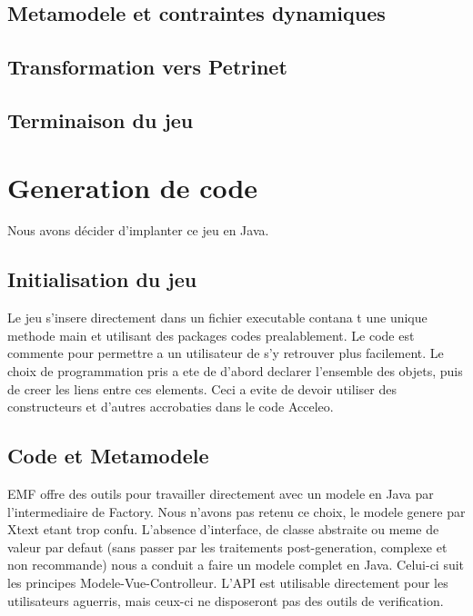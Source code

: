 \documentclass[12pt]{article}
\begin{document}
\subsection{Metamodele et contraintes dynamiques}

\subsection{Transformation vers Petrinet}

\subsection{Terminaison du jeu}

\section{Generation de code}
Nous avons décider d'implanter ce jeu en Java.
\subsection{Initialisation du jeu}
Le jeu s'insere directement dans un fichier executable contana t une unique methode main et utilisant des packages codes prealablement. Le code est commente pour permettre a un utilisateur de s'y retrouver plus facilement. Le choix de programmation pris a ete de d'abord declarer l'ensemble des objets, puis de creer les liens entre ces elements. Ceci a evite de devoir utiliser des constructeurs et d'autres accrobaties dans le code Acceleo.

\subsection{Code et Metamodele}
EMF offre des outils pour travailler directement avec un modele en Java par l'intermediaire de Factory. Nous n'avons pas retenu ce choix, le modele genere par Xtext etant trop confu. L'absence d'interface, de classe abstraite ou meme de valeur par defaut (sans passer par les traitements post-generation, complexe et non recommande) nous a conduit a faire un modele complet en Java.\newline
Celui-ci suit les principes Modele-Vue-Controlleur. L'API est utilisable directement pour les utilisateurs aguerris, mais ceux-ci ne disposeront pas des outils de verification.
\end{document}
